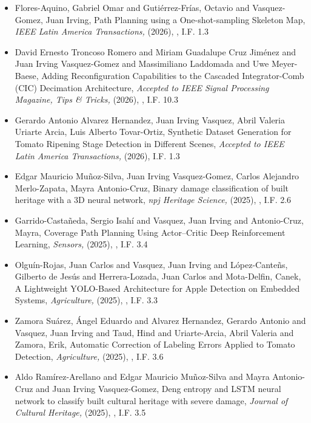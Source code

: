 \begin{itemize} 
\item Flores-Aquino, Gabriel Omar and Gutiérrez-Frías, Octavio and Vasquez-Gomez, Juan Irving, Path Planning using a One-shot-sampling Skeleton Map,\textit{ IEEE Latin America Transactions,} (2026), \href{https://latamt.ieeer9.org/index.php/transactions/article/view/10253} {\faFilePdfO}, I.F. 1.3 
\item David Ernesto Troncoso Romero and Miriam Guadalupe Cruz Jiménez and Juan Irving Vasquez-Gomez and Massimiliano Laddomada and Uwe Meyer-Baese, Adding Reconfiguration Capabilities to the Cascaded Integrator-Comb (CIC) Decimation Architecture,\textit{ Accepted to IEEE Signal Processing Magazine, Tips \& Tricks,} (2026), \href{10.1109/MSP2026-36691.39} {\faFilePdfO}, I.F. 10.3 
\item Gerardo Antonio Alvarez Hernandez, Juan Irving Vasquez, Abril Valeria Uriarte Arcia, Luis Alberto Tovar-Ortiz, Synthetic Dataset Generation for Tomato Ripening Stage Detection in Different Scenes,\textit{ Accepted to IEEE Latin America Transactions,} (2026), I.F. 1.3 
\item Edgar Mauricio Mu\~noz-Silva, Juan Irving Vasquez-Gomez, Carlos Alejandro Merlo-Zapata, Mayra Antonio-Cruz, Binary damage classification of built heritage with a 3D neural network,\textit{ npj Heritage Science,} (2025), \href{https://doi.org/10.1038/s40494-025-01597-y} {\faFilePdfO}, I.F. 2.6 
\item Garrido-Castañeda, Sergio Isahí and Vasquez, Juan Irving and Antonio-Cruz, Mayra, Coverage Path Planning Using Actor–Critic Deep Reinforcement Learning,\textit{ Sensors,} (2025), \href{https://doi.org/10.3390/s25051592} {\faFilePdfO}, I.F. 3.4 
\item Olguín-Rojas, Juan Carlos and Vasquez, Juan Irving and López-Canteñs, Gilberto de Jesús and Herrera-Lozada, Juan Carlos and Mota-Delfin, Canek, A Lightweight YOLO-Based Architecture for Apple Detection on Embedded Systems,\textit{ Agriculture,} (2025), \href{https://doi.org/10.3390/agriculture15080838} {\faFilePdfO}, I.F. 3.3 
\item Zamora Suárez, Ángel Eduardo and Alvarez Hernandez, Gerardo Antonio and Vasquez, Juan Irving and Taud, Hind and Uriarte-Arcia, Abril Valeria and Zamora, Erik, Automatic Correction of Labeling Errors Applied to Tomato Detection,\textit{ Agriculture,} (2025), \href{https://doi.org/10.3390/agriculture15121291} {\faFilePdfO}, I.F. 3.6 
\item Aldo Ramírez-Arellano and Edgar Mauricio Muñoz-Silva and Mayra Antonio-Cruz and Juan Irving Vasquez-Gomez, Deng entropy and LSTM neural network to classify built cultural heritage with severe damage,\textit{ Journal of Cultural Heritage,} (2025), \href{https://doi.org/10.1016/j.culher.2025.04.003} {\faFilePdfO}, I.F. 3.5 

\end{itemize}
